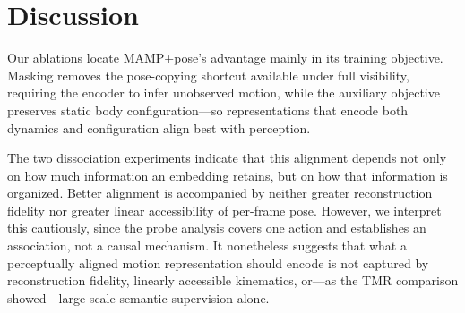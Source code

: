 \documentclass[letterpaper]{article} %
\begin{document}



\section{Discussion}
\label{sec:dissociation}


Our ablations locate MAMP+pose's advantage mainly in its training objective. Masking removes the
pose-copying shortcut available under full visibility, requiring the encoder to infer unobserved motion, while the auxiliary objective preserves static body configuration---so representations that encode both dynamics and configuration align best with perception.

The two dissociation experiments indicate that this alignment depends not only on how much
information an embedding retains, but on how that information is organized. Better alignment is
accompanied by neither greater reconstruction fidelity  nor greater linear accessibility of
per-frame pose. However, we interpret this cautiously, since the probe analysis covers one action and establishes an association, not a causal mechanism. It nonetheless suggests that what a perceptually aligned motion representation should encode is not captured by reconstruction fidelity, linearly accessible kinematics, or---as the TMR comparison showed---large-scale semantic supervision alone.
\end{document}
